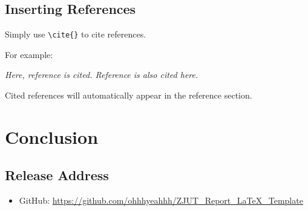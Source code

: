 \documentclass[12pt,a4paper]{article}
\begin{document}
\subsection{Inserting References}
Simply use \verb|\cite{}| to cite references\cite{DBLP:conf/nips/VaswaniSPUJGKP17}.

For example:

   \textit{ Here, reference \cite{0Isaac} is cited. Reference \cite{2016The} is also cited here.}

Cited references will automatically appear in the reference section.

\section{Conclusion}
\subsection{Release Address}
\begin{itemize}
    \item GitHub: \url{https://github.com/ohhhyeahhh/ZJUT_Report_LaTeX_Template}
\end{itemize}



\end{document}
